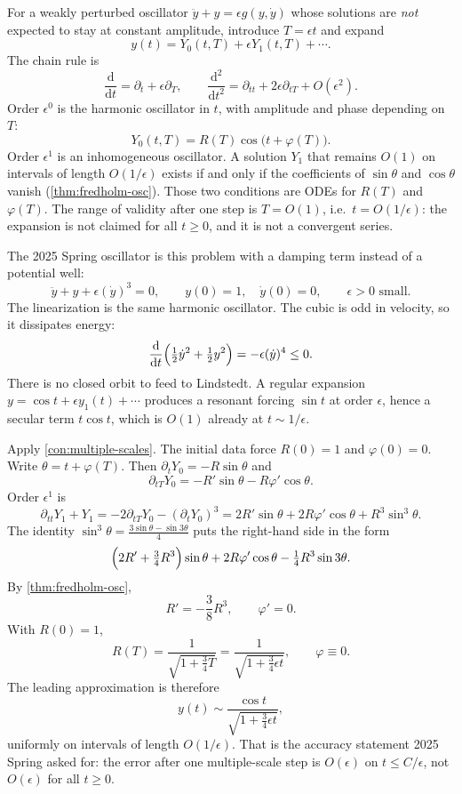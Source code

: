 \documentclass[11pt,a4paper]{article}
\begin{document}
\begin{construction}
\label{con:multiple-scales}
For a weakly perturbed oscillator \(\ddot y+y=\epsilon g(y,\dot y)\) whose solutions are \emph{not} expected to stay at constant amplitude, introduce \(T=\epsilon t\) and expand
\[
y(t)=Y_{0}(t,T)+\epsilon Y_{1}(t,T)+\cdots.
\]
The chain rule is
\[
\frac{\mathrm{d}}{\mathrm{d}t}=\partial_{t}+\epsilon\partial_{T},
\qquad
\frac{\mathrm{d}^{2}}{\mathrm{d}t^{2}}=\partial_{tt}+2\epsilon\partial_{tT}+O(\epsilon^{2}).
\]
Order \(\epsilon^{0}\) is the harmonic oscillator in \(t\), with amplitude and phase depending on \(T\):
\[
Y_{0}(t,T)=R(T)\cos\bigl(t+\varphi(T)\bigr).
\]
Order \(\epsilon^{1}\) is an inhomogeneous oscillator. A solution \(Y_{1}\) that remains \(O(1)\) on intervals of length \(O(1/\epsilon)\) exists if and only if the coefficients of \(\sin\theta\) and \(\cos\theta\) vanish (\cref{thm:fredholm-osc}). Those two conditions are ODEs for \(R(T)\) and \(\varphi(T)\). The range of validity after one step is \(T=O(1)\), i.e.\ \(t=O(1/\epsilon)\): the expansion is not claimed for all \(t\ge 0\), and it is not a convergent series.
\end{construction}

\begin{example}
\label{ex:ms-cubic-2025}
The 2025 Spring oscillator is this problem with a damping term instead of a potential well:
\[
\ddot y+y+\epsilon(\dot y)^{3}=0,
\qquad
y(0)=1,\quad \dot y(0)=0,
\qquad
\epsilon>0\text{ small}.
\]
The linearization is the same harmonic oscillator. The cubic is odd in velocity, so it dissipates energy:
\[
\frac{\mathrm{d}}{\mathrm{d}t}\Bigl(\tfrac12\dot y^{2}+\tfrac12 y^{2}\Bigr)=-\epsilon(\dot y)^{4}\le 0.
\]
There is no closed orbit to feed to Lindstedt. A regular expansion \(y=\cos t+\epsilon y_{1}(t)+\cdots\) produces a resonant forcing \(\sin t\) at order \(\epsilon\), hence a secular term \(t\cos t\), which is \(O(1)\) already at \(t\sim 1/\epsilon\).

Apply \cref{con:multiple-scales}. The initial data force \(R(0)=1\) and \(\varphi(0)=0\). Write \(\theta=t+\varphi(T)\). Then \(\partial_{t}Y_{0}=-R\sin\theta\) and
\[
\partial_{tT}Y_{0}=-R'\sin\theta-R\varphi'\cos\theta.
\]
Order \(\epsilon^{1}\) is
\[
\partial_{tt}Y_{1}+Y_{1}
=
-2\partial_{tT}Y_{0}-(\partial_{t}Y_{0})^{3}
=
2R'\sin\theta+2R\varphi'\cos\theta+R^{3}\sin^{3}\theta.
\]
The identity \(\sin^{3}\theta=\frac{3\sin\theta-\sin 3\theta}{4}\) puts the right-hand side in the form
\[
\Bigl(2R'+\tfrac34 R^{3}\Bigr)\sin\theta+2R\varphi'\cos\theta-\tfrac14 R^{3}\sin 3\theta.
\]
By \cref{thm:fredholm-osc},
\[
R'=-\frac38 R^{3},
\qquad
\varphi'=0.
\]
With \(R(0)=1\),
\[
R(T)
=
\frac{1}{\sqrt{1+\tfrac34 T}}
=
\frac{1}{\sqrt{1+\tfrac34\epsilon t}},
\qquad
\varphi\equiv 0.
\]
The leading approximation is therefore
\[
y(t)
\sim
\frac{\cos t}{\sqrt{1+\tfrac34\epsilon t}},
\]
uniformly on intervals of length \(O(1/\epsilon)\). That is the accuracy statement 2025 Spring asked for: the error after one multiple-scale step is \(O(\epsilon)\) on \(t\le C/\epsilon\), not \(O(\epsilon)\) for all \(t\ge 0\).
\end{example}
\end{document}
